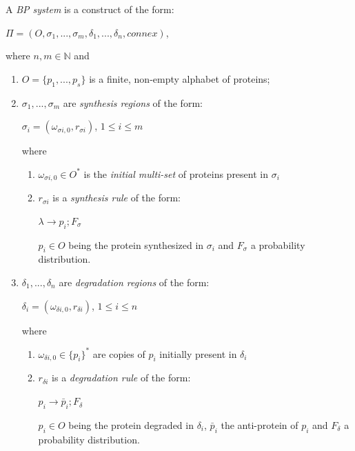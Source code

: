 \documentclass[runningheads,a4paper]{llncs}
\newcommand{\nats}{\mathbb{N}}
\newcommand{\connex}{\mathit{connex}}
\begin{document}
  A \emph{BP system} is a construct of the form:
  \begin{center}
    $\Pi = ( O, \sigma_1, ..., \sigma_m, \delta_1, ..., \delta_n, \connex)$,
  \end{center}
  where
  $n, m \in \nats$ and
  \begin{enumerate}
    \item $O=\{p_1, ..., p_s \}$ is a finite, non-empty alphabet of proteins;
    \item $\sigma_1, ..., \sigma_m$ are \emph{synthesis regions} of the form:
      \begin{center}
        $\sigma_i = (\omega_{\sigma i,0},r_{\sigma i})$, $1 \leq i \leq m$
      \end{center}
      where
        \begin{enumerate}
          \item $\omega_{\sigma i,0} \in O^*$ is the \emph{initial multi-set} of proteins present in $\sigma_i$
          \item $r_{\sigma i}$ is a \emph{synthesis rule} of the form:
            \begin{center}
              $\lambda \rightarrow p_i; F_\sigma$ 
            \end{center}
            $p_i \in O$ being the protein synthesized in $\sigma_i$ and $F_\sigma$ a probability distribution. 
        \end{enumerate} 
    \item $\delta_1, ..., \delta_n$ are \emph{degradation regions} of the form:
      \begin{center} 
        $\delta_i = (\omega_{\delta i,0},r_{\delta i})$, $1 \leq i \leq n$
      \end{center}
      where
      \begin{enumerate}
        \item $\omega_{\delta i,0} \in \{p_i\}^*$ are copies of $p_i$ initially present in $\delta_i$
        \item $r_{\delta i}$ is a \emph{degradation rule} of the form:
          \begin{center} 
            $p_i \rightarrow \bar{p}_i; F_\delta$ 
          \end{center}
            $p_i \in O$ being the protein degraded in $\delta_i$, $\bar{p}_i$ the anti-protein of $p_i$ and $F_\delta$ a probability distribution.

\end{enumerate}
\end{enumerate}
\end{document}
